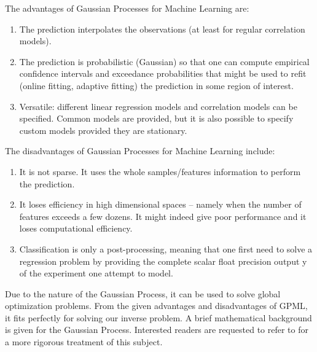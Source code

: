 The advantages of Gaussian Processes for Machine Learning are:
\begin{enumerate}
        \item The prediction interpolates the observations (at least for regular correlation models).
        \item The prediction is probabilistic (Gaussian) so that one can compute empirical confidence intervals and exceedance probabilities that might be used to refit (online fitting, adaptive fitting) the prediction in some region of interest.
        \item Versatile: different linear regression models and correlation models can be specified. Common models are provided, but it is also possible to specify custom models provided they are stationary.
\end{enumerate}
The disadvantages of Gaussian Processes for Machine Learning include:
\begin{enumerate}


        \item It is not sparse. It uses the whole samples/features information to perform the prediction.
        \item It loses efficiency in high dimensional spaces – namely when the number of features exceeds a few dozens. It might indeed give poor performance and it loses computational efficiency.
        \item Classification is only a post-processing, meaning that one first need to solve a regression problem by providing the complete scalar float precision output y of the experiment one attempt to model.

\end{enumerate}

Due to the nature of the Gaussian Process, it can be used to solve global optimization problems. From the given advantages and disadvantages of GPML, it fits perfectly for solving our inverse problem. A brief mathematical background is given for the Gaussian Process. Interested readers are requested to refer to \cite{gp} \cite{gp_tut} for a more rigorous treatment of this subject.

